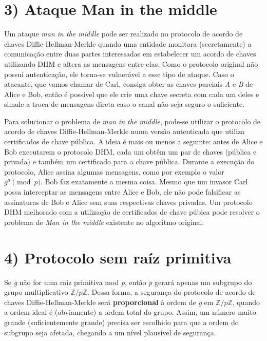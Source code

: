 \documentclass[a4paper,11pt]{article}
\theoremstyle{mytheor}
\begin{document}
\section*{3) Ataque Man in the middle}

Um ataque \textit{man in the middle} pode ser realizado no protocolo de acordo de chaves Diffie-Hellman-Merkle quando uma entidade monitora (secretamente) a comunicação entre duas partes interessadas em estabelecer um acordo de chaves utilizando DHM e altera as mensagens entre elas. Como o protocolo original não possui autenticação, ele torna-se vulnerável a esse tipo de ataque. Caso o atacante, que vamos chamar de Carl, consiga obter as chaves parciais \textit{A} e \textit{B} de Alice e Bob, então é possível que ele crie uma chave secreta com cada um deles e simule a troca de mensagens direta caso o canal não seja seguro o suficiente.

Para solucionar o problema de \textit{man in the middle}, pode-se utilizar o protocolo de acordo de chaves Diffie-Hellman-Merkle numa versão autenticada que utiliza certificados de chave pública. A ideia é mais ou menos a seguinte: antes de Alice e Bob executarem o protocolo DHM, cada um obtêm um par de chaves (pública e privada) e também um certificado para a chave pública. Durante a execução do protocolo, Alice assina algumas mensagens, como por exemplo o valor $g^{a} \pmod{p}$. Bob faz exatamente a mesma coisa. Mesmo que um invasor Carl possa interceptar as mensagens entre Alice e Bob, ele não pode falsificar as assinaturas de Bob e Alice sem suas respectivas chaves privadas. Um protocolo DHM melhorado com a utilização de certificados de chave púbica pode resolver o problema de \textit{Man in the middle} existente no algoritmo original.

\section*{4) Protocolo sem raíz primitiva}

Se \textit{g} não for uma raiz primitiva mod \textit{p}, então \textit{p} gerará apenas um subgrupo do grupo multiplicativo $\mathbb{Z}/ p \mathbb{Z}$. Dessa forma, a segurança do protocolo de acordo de chaves Diffie-Hellman-Merkle será \textbf{proporcional} à ordem de \textit{g} em $\mathbb{Z}/ p \mathbb{Z}$, quando a ordem ideal é (obviamente) a ordem total do grupo. Assim, um número muito grande (suficientemente grande) precisa ser escolhido para que a ordem do subgrupo seja afetada, chegando a um nível plausível de segurança.
\end{document}

